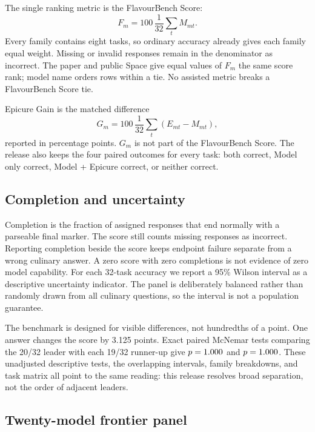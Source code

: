 \documentclass[10pt,twocolumn]{article}
\begin{document}
The single ranking metric is the FlavourBench Score:
\begin{equation}
 F_m = 100\,\frac{1}{32}\sum_t M_{mt}.
 \label{eq:score}
\end{equation}
Every family contains eight tasks, so ordinary accuracy already gives each family equal weight.
Missing or invalid responses remain in the denominator as incorrect. The paper and public Space
give equal values of $F_m$ the same score rank; model name orders rows within a tie. No assisted
metric breaks a FlavourBench Score tie.

Epicure Gain is the matched difference
\begin{equation}
 G_m = 100\,\frac{1}{32}\sum_t\left(E_{mt}-M_{mt}\right),
 \label{eq:uplift}
\end{equation}
reported in percentage points. $G_m$ is not part of the FlavourBench Score. The release also keeps
the four paired outcomes for every task: both correct, Model only correct, Model + Epicure correct,
or neither correct.

\subsection{Completion and uncertainty}

Completion is the fraction of assigned responses that end normally with a parseable final marker.
The score still counts missing responses as incorrect. Reporting completion beside the score keeps
endpoint failure separate from a wrong culinary answer. A zero score with zero completions is not
evidence of zero model capability. For each 32-task accuracy we report a 95\% Wilson interval as a
descriptive uncertainty indicator. The panel is deliberately balanced rather than randomly drawn
from all culinary questions, so the interval is not a population guarantee.

The benchmark is designed for visible differences, not hundredths of a point. One answer changes
the score by 3.125 points. Exact paired McNemar tests comparing the 20/32 leader with each 19/32
runner-up give $p=1.000{}$ and $p=1.000{}$. These unadjusted descriptive tests,
the overlapping intervals, family breakdowns, and task matrix all point to the same reading: this
release resolves broad separation, not the order of adjacent leaders.

\subsection{Twenty-model frontier panel}
\end{document}
